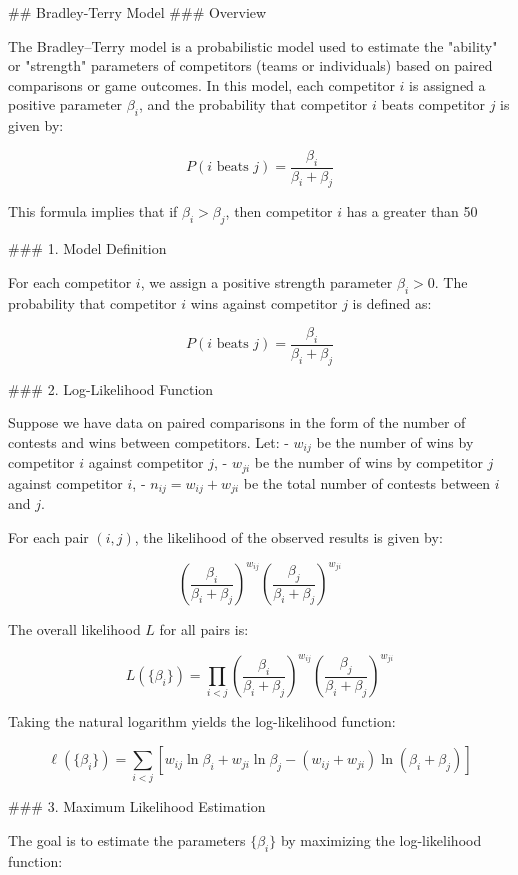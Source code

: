 ## Bradley-Terry Model
### Overview

The Bradley–Terry model is a probabilistic model used to estimate the "ability" or "strength" parameters of competitors (teams or individuals) based on paired comparisons or game outcomes. In this model, each competitor \(i\) is assigned a positive parameter \(\beta_i\), and the probability that competitor \(i\) beats competitor \(j\) is given by:

\[
P(i \text{ beats } j) = \frac{\beta_i}{\beta_i + \beta_j}
\]

This formula implies that if \(\beta_i > \beta_j\), then competitor \(i\) has a greater than 50%

### 1. Model Definition

For each competitor \(i\), we assign a positive strength parameter \(\beta_i > 0\). The probability that competitor \(i\) wins against competitor \(j\) is defined as:

\[
P(i \text{ beats } j) = \frac{\beta_i}{\beta_i + \beta_j}
\]

### 2. Log-Likelihood Function

Suppose we have data on paired comparisons in the form of the number of contests and wins between competitors. Let:
- \(w_{ij}\) be the number of wins by competitor \(i\) against competitor \(j\),
- \(w_{ji}\) be the number of wins by competitor \(j\) against competitor \(i\),
- \(n_{ij} = w_{ij} + w_{ji}\) be the total number of contests between \(i\) and \(j\).

For each pair \((i, j)\), the likelihood of the observed results is given by:

\[
\left(\frac{\beta_i}{\beta_i + \beta_j}\right)^{w_{ij}} \left(\frac{\beta_j}{\beta_i + \beta_j}\right)^{w_{ji}}
\]

The overall likelihood \(L\) for all pairs is:

\[
L(\{\beta_i\}) = \prod_{i<j} \left(\frac{\beta_i}{\beta_i + \beta_j}\right)^{w_{ij}} \left(\frac{\beta_j}{\beta_i + \beta_j}\right)^{w_{ji}}
\]

Taking the natural logarithm yields the log-likelihood function:

\[
\ell(\{\beta_i\}) = \sum_{i<j} \left[ w_{ij} \ln \beta_i + w_{ji} \ln \beta_j - (w_{ij}+w_{ji}) \ln (\beta_i + \beta_j) \right]
\]

### 3. Maximum Likelihood Estimation

The goal is to estimate the parameters \(\{\beta_i\}\) by maximizing the log-likelihood function:

